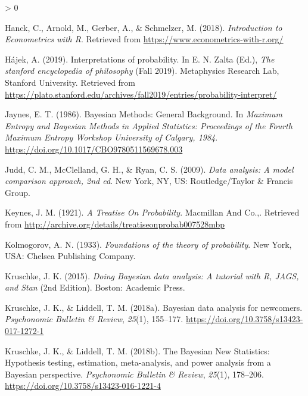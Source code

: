 \documentclass[
  a4paper,11pt,twoside,onecolumn,openright,final,oldfontcommands]{memoir}
\newlength{\cslhangindent}
\newenvironment{CSLReferences}[2] %
 {%
  \setlength{\parindent}{0pt}
  \ifodd #1 \everypar{\setlength{\hangindent}{\cslhangindent}}\ignorespaces\fi
  \ifnum #2 > 0
  \setlength{\parskip}{#2\baselineskip}
  \fi
 }%
 {}
\theoremstyle{definition}
\theoremstyle{definition}
\theoremstyle{definition}
\theoremstyle{remark}
\begin{document}
\begin{CSLReferences}{1}{0}
\leavevmode\hypertarget{ref-hanck_introduction_2018}{}%
Hanck, C., Arnold, M., Gerber, A., \& Schmelzer, M. (2018). \emph{Introduction to {Econometrics} with {R}}. Retrieved from \url{https://www.econometrics-with-r.org/}

\leavevmode\hypertarget{ref-sep-probability-interpret}{}%
Hájek, A. (2019). Interpretations of probability. In E. N. Zalta (Ed.), \emph{The stanford encyclopedia of philosophy} (Fall 2019). Metaphysics Research Lab, Stanford University. Retrieved from \url{https://plato.stanford.edu/archives/fall2019/entries/probability-interpret/}

\leavevmode\hypertarget{ref-jaynes_bayesian_1986}{}%
Jaynes, E. T. (1986). Bayesian {Methods}: {General} {Background}. In \emph{Maximum {Entropy} and {Bayesian} {Methods} in {Applied} {Statistics}: {Proceedings} of the {Fourth} {Maximum} {Entropy} {Workshop} {University} of {Calgary}, 1984}. \url{https://doi.org/10.1017/CBO9780511569678.003}

\leavevmode\hypertarget{ref-judd_data_2009}{}%
Judd, C. M., McClelland, G. H., \& Ryan, C. S. (2009). \emph{Data analysis: {A} model comparison approach, 2nd ed}. New York, NY, US: Routledge/Taylor \& Francis Group.

\leavevmode\hypertarget{ref-keynes_treatise_1921}{}%
Keynes, J. M. (1921). \emph{A {Treatise} {On} {Probability}}. Macmillan And Co.,. Retrieved from \url{http://archive.org/details/treatiseonprobab007528mbp}

\leavevmode\hypertarget{ref-kolmogorov_foundations_1933}{}%
Kolmogorov, A. N. (1933). \emph{Foundations of the theory of probability}. New York, USA: Chelsea Publishing Company.

\leavevmode\hypertarget{ref-kruschke_doing_2015}{}%
Kruschke, J. K. (2015). \emph{Doing {Bayesian} data analysis: A tutorial with {R}, {JAGS}, and {Stan}} (2nd Edition). Boston: Academic Press.

\leavevmode\hypertarget{ref-kruschke_bayesian_2018}{}%
Kruschke, J. K., \& Liddell, T. M. (2018a). Bayesian data analysis for newcomers. \emph{Psychonomic Bulletin \& Review}, \emph{25}(1), 155--177. \url{https://doi.org/10.3758/s13423-017-1272-1}

\leavevmode\hypertarget{ref-kruschke_bayesian_2018-1}{}%
Kruschke, J. K., \& Liddell, T. M. (2018b). The {Bayesian} {New} {Statistics}: {Hypothesis} testing, estimation, meta-analysis, and power analysis from a {Bayesian} perspective. \emph{Psychonomic Bulletin \& Review}, \emph{25}(1), 178--206. \url{https://doi.org/10.3758/s13423-016-1221-4}


\end{CSLReferences}
\end{document}
